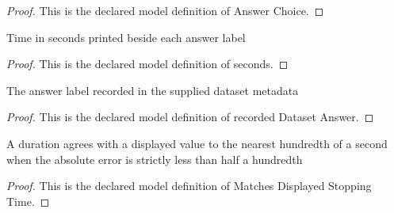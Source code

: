 \begin{proof}
  This is the declared model definition of Answer Choice.
\end{proof}
\begin{definition}[seconds]
  \label{def:physics:phyx-mini-0781:phyxminiproblems-problemphyxmini0781-answerchoice-seconds}
  Time in seconds printed beside each answer label
\end{definition}
\begin{proof}
  This is the declared model definition of seconds.
\end{proof}
\begin{definition}
  \label{def:physics:phyx-mini-0781:phyxminiproblems-problemphyxmini0781-recordeddatasetanswer}
  The answer label recorded in the supplied dataset metadata
\end{definition}
\begin{proof}
  This is the declared model definition of recorded Dataset Answer.
\end{proof}
\begin{definition}
  \label{def:physics:phyx-mini-0781:phyxminiproblems-problemphyxmini0781-matchesdisplayedstoppingtime}
  A duration agrees with a displayed value to the nearest hundredth of a second when the absolute error is strictly less than half a hundredth
\end{definition}
\begin{proof}
  This is the declared model definition of Matches Displayed Stopping Time.
\end{proof}
